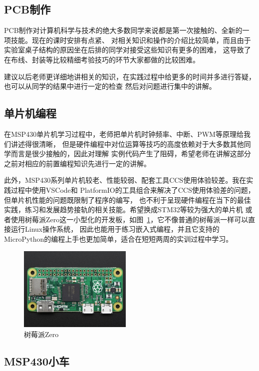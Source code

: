 \documentclass[a4paper,twoside,zihao=5,UTF8]{ctexart}
\begin{document}
\begin{spacing}{1.2}
\subsection{PCB制作}

PCB制作对计算机科学与技术的绝大多数同学来说都是第一次接触的、全新的一项技能。现在的课时安排有点紧、
对相关知识和操作的介绍比较简单，而且由于实验室桌子结构的原因坐在后排的同学对接受这些知识有更多的困难，
这导致了在布线、封装等比较精细考验技巧的环节大家都做的比较困难。

建议以后老师更详细地讲相关的知识，在实践过程中给更多的时间并多进行答疑，也可以从同学的结果中进行一定的检查
然后对问题进行集中的讲解。

\subsection{单片机编程}

在MSP430单片机学习过程中，老师把单片机时钟频率、中断、PWM等原理给我们讲述得很清晰，
但是硬件编程中对位运算等技巧的高度依赖对于大多数其他同学而言是很少接触的，因此对理解
实例代码产生了阻碍，希望老师在讲解这部分之前对相应的前置编程知识先进行一定的讲解。

此外，MSP430系列单片机较老、性能较弱、配套工具CCS使用体验较差。我在实践过程中使用VSCode和
PlatformIO的工具组合来解决了CCS使用体验差的问题，但单片机性能的问题既限制了程序的编写，
也不利于呈现硬件编程在当下的最佳实践，练习和发展趋势接轨的相关技能。希望换成STM32等较为强大的单片机
或者使用树莓派Zero这一小型化的开发板，如图~\ref{fig:rpi0}，它不像普通的树莓派一样可以直接运行Linux操作系统，
因此也能用于练习嵌入式编程，并且它支持的MicroPython的编程上手也更加简单，适合在短短两周的实训过程中学习。

\begin{figure}[htb]
	\centering
	\caption{树莓派Zero}
	\label{fig:rpi0}
	\includegraphics[width=0.48\textwidth]{rpi0.jpg}
\end{figure}

\subsection{MSP430小车}


\end{spacing}
\end{document}
